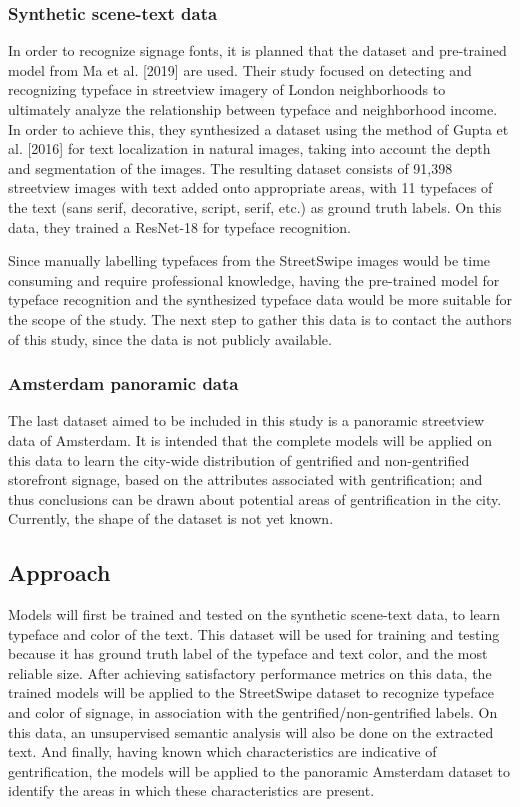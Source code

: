 \subsubsection{Synthetic scene-text data}
In order to recognize signage fonts, it is planned that the dataset and pre-trained model from Ma et al. [2019] \cite{ma2019} are used. Their study focused on detecting and recognizing typeface in streetview imagery of London neighborhoods to ultimately analyze the relationship between typeface and neighborhood income. In order to achieve this, they synthesized a dataset using the method of Gupta et al. [2016] \cite{gupta2016} for text localization in natural images, taking into account the depth and segmentation of the images. The resulting dataset consists of 91,398 streetview images with text added onto appropriate areas, with 11 typefaces of the text (sans serif, decorative, script, serif, etc.) as ground truth labels. On this data, they trained a ResNet-18 for typeface recognition. 

Since manually labelling typefaces from the StreetSwipe images would be time consuming and require professional knowledge, having the pre-trained model for typeface recognition and the synthesized typeface data would be more suitable for the scope of the study. The next step to gather this data is to contact the authors of this study, since the data is not publicly available.

\subsubsection{Amsterdam panoramic data}
The last dataset aimed to be included in this study is a panoramic streetview data of Amsterdam. It is intended that the complete models will be applied on this data to learn the city-wide distribution of gentrified and non-gentrified storefront signage, based on the attributes associated with gentrification; and thus conclusions can be drawn about potential areas of gentrification in the city. Currently, the shape of the dataset is not yet known.

\subsection{Approach}
Models will first be trained and tested on the synthetic scene-text data, to learn typeface and color of the text. This dataset will be used for training and testing because it has ground truth label of the typeface and text color, and the most reliable size. After achieving satisfactory performance metrics on this data, the trained models will be applied to the StreetSwipe dataset to recognize typeface and color of signage, in association with the gentrified/non-gentrified labels. On this data, an unsupervised semantic analysis will also be done on the extracted text. And finally, having known which characteristics are indicative of gentrification, the models will be applied to the panoramic Amsterdam dataset to identify the areas in which these characteristics are present.

